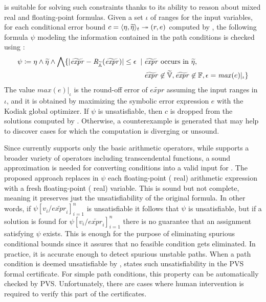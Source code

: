 \documentclass[runningheads,american,orivec,fleqn]{llncs}
\begin{document}
\smttool{} is suitable for solving such constraints thanks to its ability to reason about mixed real and floating-point formulas.
%
Given a set $\iota$ of ranges for the input variables, for each conditional error bound $c = \cerr{\eta}{\widetilde{\eta}}{r}{e}{}{t}$ computed by \tool{}, the following formula $\psi$ modeling the information contained in the path conditions is checked using \smttool{}:
% 
\begin{equation}
    \begin{aligned}[t]
    \psi \dfn \eta \wedge \widetilde{\eta} \wedge
    \bigwedge\{|\widetilde{\mathit{expr}} - \FtoRA{\widetilde{\mathit{expr}}}| \leq \epsilon
    \; \mid \; & \widetilde{\mathit{expr}} \text{ occurs in } \widetilde{\eta},\\
      &
     \widetilde{\mathit{expr}}\not\in\FVar, \widetilde{\mathit{expr}}\not\in\Fp,
     \epsilon = \mathit{max}(e)|_{\iota}\}
     \end{aligned}
\end{equation}
%
The value $\mathit{max}(e)|_{\iota}$ is the round-off error of $\widetilde{\mathit{expr}}$ assuming the input ranges in $\iota$, and it is obtained by maximizing the symbolic error expression $e$ with the Kodiak global optimizer.
If $\psi$ is unsatisfiable, then $c$ is dropped from the solutions computed by \tool{}.
%
Otherwise, a counterexample is generated that may help to discover cases for which the computation is diverging or unsound.

Since \smttool{} currently supports only the basic arithmetic operators, while \tool{} supports a broader variety of operators including transcendental functions, a sound approximation is needed for converting \tool{} conditions into a valid input for \smttool{}.
%
The proposed approach replaces in $\psi$ each floating-point (\resp{} real) arithmetic expression with a fresh floating-point (\resp{} real) variable.
% 
This is sound but not complete, meaning it preserves just the unsatisfiability of the original formula.
% 
In other words, if $\psi[v_i/\widetilde{\mathit{expr}_i}]_{i=1}^n$ is unsatisfiable it follows that $\psi$ is unsatisfiable, but if a solution is found for $\psi[v_i/\widetilde{\mathit{expr}_i}]_{i=1}^n$ there is no guarantee that an assignment satisfying $\psi$ exists. 
%
This is enough for the purpose of eliminating spurious conditional bounds since it assures that no feasible condition gets eliminated.
%
In practice, it is accurate enough to detect spurious unstable paths.
% 
When a path condition is deemed unsatisfiable by \smttool{}, \tool{} states such unsatisfiability in the PVS formal certificate.
%
For simple path conditions, this property can be automatically checked by PVS. Unfortunately, there are cases where human intervention is required to verify this part of the certificates.
\end{document}
